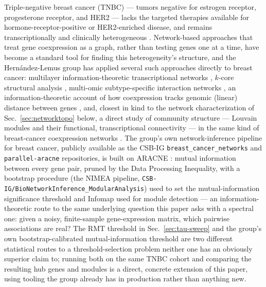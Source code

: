 \documentclass[11pt]{article}
\begin{document}
Triple-negative breast cancer (TNBC) --- tumors negative for estrogen
receptor, progesterone receptor, and HER2 --- lacks the targeted
therapies available for hormone-receptor-positive or HER2-enriched
disease, and remains transcriptionally and clinically heterogeneous
\citep{foulkes2010}. Network-based approaches that treat gene
coexpression as a graph, rather than testing genes one at a time, have
become a standard tool for finding this heterogeneity's structure,
and the Hern\'andez-Lemus group has applied several such approaches
directly to breast cancer: multilayer information-theoretic
transcriptional networks \citep{multilayer2021}, $k$-core structural
analysis \citep{kcore2021}, multi-omic subtype-specific interaction
networks \citep{multiomic2022}, an information-theoretic account of how
coexpression tracks genomic (linear) distance between genes
\citep{gonzalezespinoza2021}, and, closest in kind to the network
characterization of Sec.~\ref{sec:networktopo} below, a direct study of
community structure --- Louvain modules and their functional,
transcriptional connectivity --- in the same kind of breast-cancer
coexpression networks \citep{deandajauregui2019networks}. The group's own network-inference
pipeline for breast cancer, publicly available as the CSB-IG
\texttt{breast\_cancer\_networks} and \texttt{parallel-aracne}
repositories, is built on ARACNE \citep{margolin2006}: mutual
information between every gene pair, pruned by the Data Processing
Inequality, with a bootstrap procedure (the NIMEA pipeline,
\texttt{CSB-IG/BioNetworkInference\_ModularAnalysis}) used to set the
mutual-information significance threshold and Infomap used for module
detection --- an information-theoretic route to the same underlying
question this paper asks with a spectral one: given a noisy,
finite-sample gene-expression matrix, which pairwise associations are
real? The RMT threshold in Sec.~\ref{sec:tau-sweep} and the
group's own bootstrap-calibrated mutual-information threshold are two
different statistical routes to a threshold-selection problem neither
one has an obviously superior claim to; running both on the same TNBC
cohort and comparing the resulting hub genes and modules is a direct,
concrete extension of this paper, using tooling the group already has
in production rather than anything new.
\end{document}
